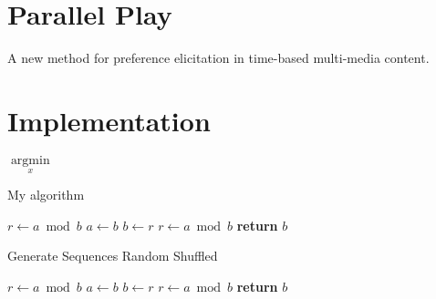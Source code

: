 \section{Parallel Play}
A new method for preference elicitation in time-based multi-media content.

\section{Implementation}
\label{sec:implementation}

$\underset{x}{\operatorname{argmin}}$

\begin{algorithm}
  \caption{My algorithm}
  \begin{algorithmic}[1]
      \State $r\gets a\bmod b$
        \State $a\gets b$
        \State $b\gets r$
        \State $r\gets a\bmod b$
      \EndWhile\label{euclidendwhile}
      \State \textbf{return} $b$
    \EndProcedure

  \end{algorithmic}
\end{algorithm}

% 
% 

\begin{algorithm}
  \caption{Generate Sequences Random Shuffled}
  \begin{algorithmic}[1]
      \State $r\gets a\bmod b$
        \State $a\gets b$
        \State $b\gets r$
        \State $r\gets a\bmod b$
      \EndWhile
      \State \textbf{return} $b$
    \EndProcedure

  \end{algorithmic}
\end{algorithm}